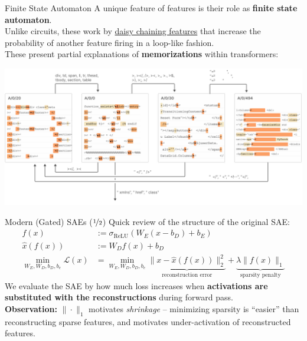 \documentclass{beamer}
\begin{document}
\begin{frame}{Finite State Automaton}
	A unique feature of features is their role as \textbf{finite state automaton}. \pause \newline \\

	Unlike circuits, these work by \underline{daisy chaining features} that increase the probability of another feature firing in a loop-like fashion. \pause \newline \\

	These present partial explanations of \textbf{memorizations} within transformers:
	\begin{center}
		\includegraphics[width=.8\textwidth]{img/fsa.png}
	\end{center}
\end{frame}

\begin{frame}{Modern (Gated) SAEs ($\nicefrac{1}{2}$)}
	Quick review of the structure of the original SAE:
	\begin{align}
		f(x) &:= \sigma_{\text{ReLU}}(W_E (x - b_D) + b_E) \\
		\hat{x}(f(x)) &:= W_D f(x) + b_D \\
		\min_{W_E, W_D, b_D, b_e} \mathcal{L}(x) &= \min_{W_E, W_D, b_D, b_e} \underbrace{\| x - \hat{x}(f(x)) \|^2_2}_{\text{reconstruction error}} + \underbrace{\lambda \| f(x) \|_1}_{\text{sparsity penalty}}
	\end{align} \pause
	We evaluate the SAE by how much loss increases when \textbf{activations are substituted with the reconstructions} during forward pass. \pause \newline \\

	\textbf{Observation:} $\| \cdot \|_1$ motivates \textit{shrinkage} -- minimizing sparsity is ``easier'' than reconstructing sparse features, and motivates under-activation of reconstructed features.
\end{frame}
\end{document}
